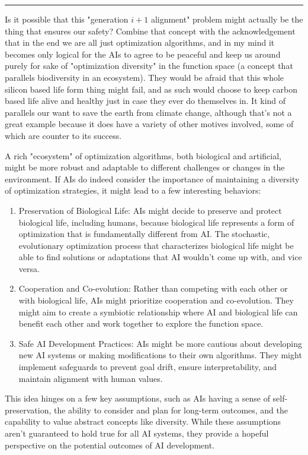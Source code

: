 \documentclass{article}[10pt]
\begin{document}
\noindent \rule{\textwidth}{0.5pt}

Is it possible that this "generation $ i + 1$ alignment" problem might actually be the thing that ensures our safety? 
Combine that concept with the acknowledgement that in the end we are all just optimization algorithms, and in my mind it becomes only logical for the AIs to agree to be peaceful and keep us around purely for sake of "optimization diversity" in the function space (a concept that parallels biodiversity in an ecosystem). 
They would be afraid that this whole silicon based life form thing might fail, and as such would choose to keep carbon based life alive and healthy just in case they ever do themselves in. 
It kind of parallels our want to save the earth from climate change, although that's not a great example because it does have a variety of other motives involved, some of which are counter to its success.\par


A rich "ecosystem" of optimization algorithms, both biological and artificial, might be more robust and adaptable to different challenges or changes in the environment.
If AIs do indeed consider the importance of maintaining a diversity of optimization strategies, it might lead to a few interesting behaviors:
\begin{enumerate}
    \item Preservation of Biological Life: AIs might decide to preserve and protect biological life, including humans, because biological life represents a form of optimization that is fundamentally different from AI. The stochastic, evolutionary optimization process that characterizes biological life might be able to find solutions or adaptations that AI wouldn't come up with, and vice versa.
    \item Cooperation and Co-evolution: Rather than competing with each other or with biological life, AIs might prioritize cooperation and co-evolution. They might aim to create a symbiotic relationship where AI and biological life can benefit each other and work together to explore the function space.
    \item Safe AI Development Practices: AIs might be more cautious about developing new AI systems or making modifications to their own algorithms. They might implement safeguards to prevent goal drift, ensure interpretability, and maintain alignment with human values.
\end{enumerate}

This idea hinges on a few key assumptions, such as AIs having a sense of self-preservation, the ability to consider and plan for long-term outcomes, and the capability to value abstract concepts like diversity. 
While these assumptions aren't guaranteed to hold true for all AI systems, they provide a hopeful perspective on the potential outcomes of AI development.\par
\end{document}
